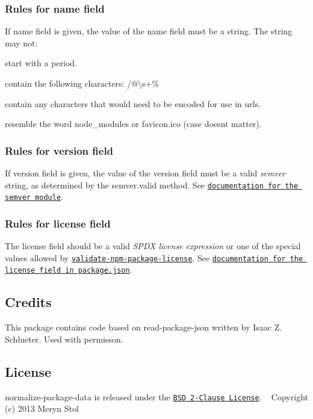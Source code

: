 \subsubsection*{Rules for name field}

If {\ttfamily name} field is given, the value of the name field must be a string. The string may not\+:


\begin{DoxyItemize}
\item start with a period.
\item contain the following characters\+: {\ttfamily /@\textbackslash{}s+\%}
\item contain any characters that would need to be encoded for use in urls.
\item resemble the word {\ttfamily node\+\_\+modules} or {\ttfamily favicon.\+ico} (case doesn\textquotesingle{}t matter).
\end{DoxyItemize}

\subsubsection*{Rules for version field}

If {\ttfamily version} field is given, the value of the version field must be a valid {\itshape semver} string, as determined by the {\ttfamily semver.\+valid} method. See \href{https://github.com/isaacs/node-semver}{\tt documentation for the semver module}.

\subsubsection*{Rules for license field}

The {\ttfamily license} field should be a valid {\itshape S\+P\+DX license expression} or one of the special values allowed by \href{https://npmjs.com/packages/validate-npm-package-license}{\tt validate-\/npm-\/package-\/license}. See \href{https://docs.npmjs.com/files/package.json#license}{\tt documentation for the license field in package.\+json}.

\subsection*{Credits}

This package contains code based on read-\/package-\/json written by Isaac Z. Schlueter. Used with permisson.

\subsection*{License}

normalize-\/package-\/data is released under the \href{http://opensource.org/licenses/MIT}{\tt B\+SD 2-\/\+Clause License}. ~\newline
Copyright (c) 2013 Meryn Stol 